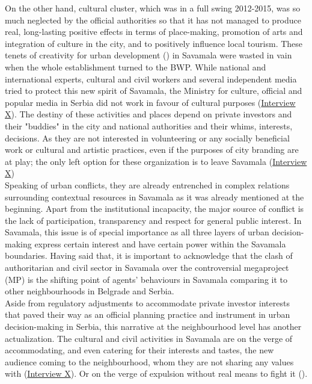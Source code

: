 \documentclass[11pt]{report}
\begin{document}
On the other hand, cultural cluster, which was in a full swing 2012-2015, was so much neglected by the official authorities so that it has not managed to produce real, long-lasting positive effects in terms of place-making, promotion of arts and integration of culture in the city, and to positively influence local tourism. These tenets of creativity for urban development (\href{Daniels}{\cite{Daniels 2012???}}) in Savamala were wasted in vain when the whole establishment turned to the BWP.
While national and international experts, cultural and civil workers and several independent media tried to protect this new spirit of Savamala, the Ministry for culture, official and popular media in Serbia did not work in favour of cultural purposes
(\href{InterviewX}{Interview X}).
The destiny of these activities and places depend on private investors and their "buddies" in the city and national authorities and their whims, interests, decisions.
As they are not interested in volunteering or any socially beneficial work or cultural and artistic practices, even if the purposes of city branding are at play; the only left option for these organization is to leave Savamala
(\href{InterviewX}{Interview X})
\\

Speaking of urban conflicts, they are already entrenched in complex relations surrounding contextual resources in Savamala as it was already mentioned at the beginning.
Apart from the institutional incapacity, the major source of conflict is the lack of participation, transparency and respect for general public interest.
In Savamala, this issue is of special importance as all three layers of urban decision-making express certain interest and have certain power within the Savamala boundaries.
Having said that, it is important to acknowledge that the clash of authoritarian and civil sector in Savamala over the controversial megaproject (MP) is the shifting point of agents' behaviours in Savamala comparing it to other neighbourhoods in Belgrade and Serbia.
\\

Aside from regulatory adjustments to accommodate private investor interests that paved their way as an official planning practice and instrument in urban decision-making in Serbia, this narrative at the neighbourhood level has another actualization.
The cultural and civil activities in Savamala are on the verge of accommodating, and even catering for their interests and tastes, the new audience coming to the neighbourhood, whom they are not sharing any values with
(\href{InterviewX}{Interview X}).
Or on the verge of expulsion without real means to fight it (\cite{ref media}). 
\\
\end{document}
